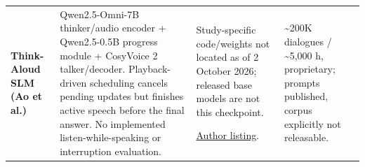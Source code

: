 \begin{longtable}{@{}>{\raggedright\arraybackslash}p{0.22\tablewidth}>{\raggedright\arraybackslash}p{0.43\tablewidth}>{\raggedright\arraybackslash}p{0.20\tablewidth}>{\raggedright\arraybackslash}p{0.15\tablewidth}@{}}
\addlinespace[4pt]
\textbf{Think-Aloud SLM (Ao et al.)}\par\citep{thinkaloud} & Qwen2.5-Omni-7B thinker/audio encoder + Qwen2.5-0.5B progress module + CosyVoice 2 talker/decoder. Playback-driven scheduling cancels pending updates but finishes active speech before the final answer. No implemented listen-while-speaking or interruption evaluation. & Study-specific code/weights not located as of 2 October 2026; released base models are not this checkpoint.\par \href{https://liuxubo717.github.io/}{Author listing}. & \textasciitilde{}200K dialogues / \textasciitilde{}5,000 h, proprietary; prompts published, corpus explicitly not releasable. \\
\end{longtable}
\endgroup

